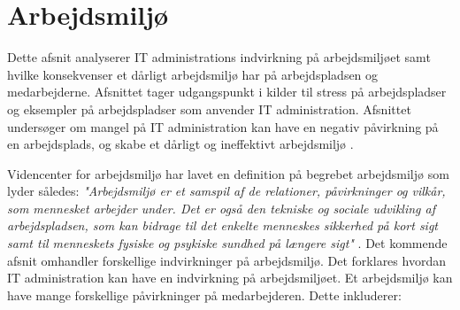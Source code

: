 


\section{Arbejdsmiljø}
Dette afsnit analyserer IT administrations indvirkning på arbejdsmiljøet samt hvilke konsekvenser et dårligt arbejdsmiljø har på arbejdspladsen og medarbejderne. Afsnittet tager udgangspunkt i kilder til stress på arbejdspladser og eksempler på arbejdspladser som anvender IT administration. Afsnittet undersøger om mangel på IT administration kan have en negativ påvirkning på en arbejdsplads, og skabe et dårligt og ineffektivt arbejdsmiljø \citep{Cambridge2011}.

Videncenter for arbejdsmiljø har lavet en definition på begrebet arbejdsmiljø som lyder således: \textit{"Arbejdsmiljø er et samspil af de relationer, påvirkninger og vilkår, som mennesket arbejder under. Det er også den tekniske og sociale udvikling af arbejdspladsen, som kan bidrage til det enkelte menneskes sikkerhed på kort sigt samt til menneskets fysiske og psykiske sundhed på længere sigt"} \citep{Arbejdsmiljoe}. Det kommende afsnit omhandler forskellige indvirkninger på arbejdsmiljø. Det forklares hvordan IT administration kan have en indvirkning på arbejdsmiljøet. Et arbejdsmiljø kan have mange forskellige påvirkninger på medarbejderen. Dette inkluderer:


